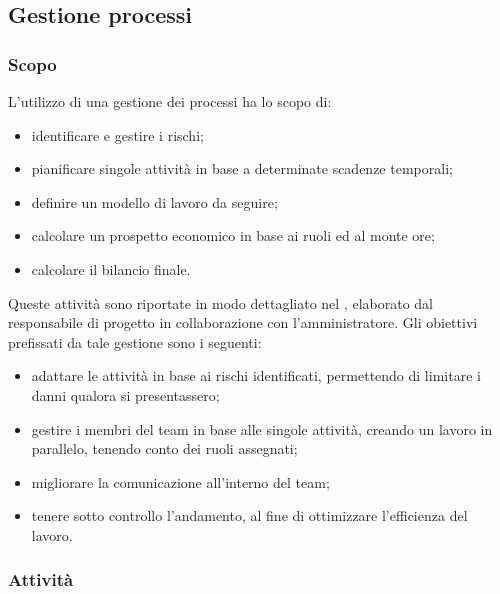 \subsection{Gestione processi}

	\subsubsection{Scopo}
	L'utilizzo di una gestione dei processi ha lo scopo di:
	\begin{itemize}
		\item identificare e gestire i rischi;
		\item pianificare singole attività in base a determinate scadenze temporali;
		\item definire un modello di lavoro da seguire;
		\item calcolare un prospetto economico in base ai ruoli ed al monte ore;
		\item calcolare il bilancio finale.
	\end{itemize}
	Queste attività sono riportate in modo dettagliato nel , elaborato dal responsabile di progetto in collaborazione con l'amministratore.
	Gli obiettivi prefissati da tale gestione sono i seguenti:
	\begin{itemize}
		\item adattare le attività in base ai rischi identificati, permettendo di limitare i danni qualora si presentassero;
		\item gestire i membri del team in base alle singole attività, creando un lavoro in parallelo, tenendo conto dei ruoli assegnati;
		\item migliorare la comunicazione all'interno del team;
		\item tenere sotto controllo l'andamento, al fine di ottimizzare l'efficienza del lavoro.
	\end{itemize}

	\subsubsection{Attività}
